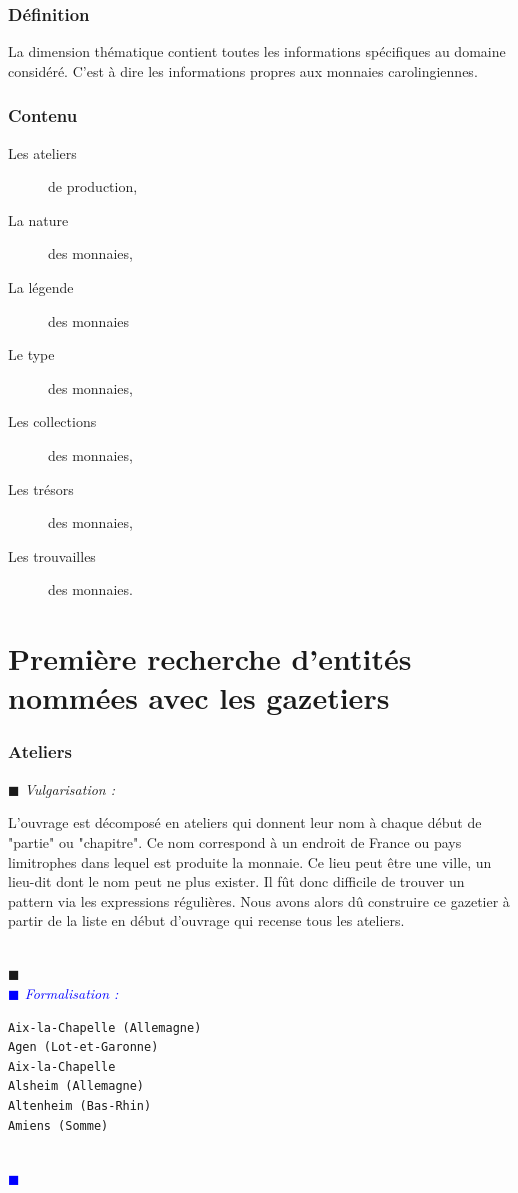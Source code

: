 \documentclass[a4paper, 11pt]{report}
\newenvironment{vulgarisation}
    {
    \textit{\textcolor{dark-blue}{$\blacksquare$  Vulgarisation : \\}}

    }
    {
    ~\\\textcolor{dark-blue}{$\blacksquare$}\\
    }
\newenvironment{formalisation}
    {
    \textit{\textcolor{blue}{$\blacksquare$  Formalisation : \\}}
    }
    {
    ~\\\textcolor{blue}{$\blacksquare$}\\
    }
\begin{document}
        \subsubsection{Définition}
    La dimension thématique contient toutes les informations spécifiques au domaine considéré.  C'est à dire les informations propres aux monnaies carolingiennes.
    \subsubsection{Contenu} 
    \begin{description}
    \item[Les ateliers] de production,
    \item[La nature] des monnaies,
    \item[La légende] des monnaies
    \item[Le type] des monnaies,
    \item[Les collections] des monnaies,
    \item[Les trésors] des monnaies,
    \item[Les trouvailles] des monnaies.
    \end{description}
    
    
    \section{Première recherche d'entités nommées avec les gazetiers}
    \subsubsection{Ateliers}
\begin{vulgarisation}
    L'ouvrage est décomposé en ateliers qui donnent leur nom à chaque début de "partie" ou "chapitre". Ce nom correspond à un endroit de France ou pays limitrophes dans lequel est produite la monnaie. Ce lieu peut être une ville, un lieu-dit dont le nom peut ne plus exister. Il fût donc difficile de trouver un pattern via les expressions régulières. Nous avons alors dû construire ce gazetier à partir de la liste en début d'ouvrage qui recense tous les ateliers.
\end{vulgarisation}
\begin{formalisation}
\begin{verbatim}
Aix-la-Chapelle (Allemagne)
Agen (Lot-et-Garonne)
Aix-la-Chapelle
Alsheim (Allemagne)
Altenheim (Bas-Rhin)
Amiens (Somme)
\end{verbatim}
\end{formalisation}
\end{document}
